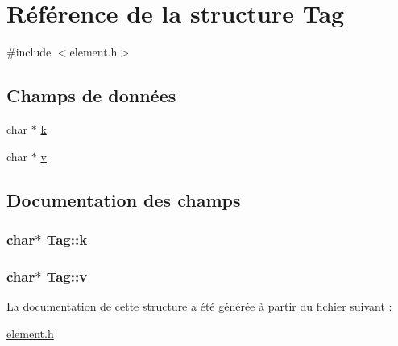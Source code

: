 \hypertarget{struct_tag}{\section{Référence de la structure Tag}
\label{struct_tag}
}


{\ttfamily \#include $<$element.\-h$>$}

\subsection*{Champs de données}
\begin{DoxyCompactItemize}
\item 
char $\ast$ \hyperlink{struct_tag_ab3bdc16ca229758a03a276652a061dff_ab3bdc16ca229758a03a276652a061dff}{k}
\item 
char $\ast$ \hyperlink{struct_tag_a647fb3252fe8d9a2f0eb7478685241fe_a647fb3252fe8d9a2f0eb7478685241fe}{v}
\end{DoxyCompactItemize}


\subsection{Documentation des champs}
\hypertarget{struct_tag_ab3bdc16ca229758a03a276652a061dff_ab3bdc16ca229758a03a276652a061dff}{
\subsubsection[{k}]{\setlength{\rightskip}{0pt plus 5cm}char$\ast$ Tag\-::k}}\label{struct_tag_ab3bdc16ca229758a03a276652a061dff_ab3bdc16ca229758a03a276652a061dff}
\hypertarget{struct_tag_a647fb3252fe8d9a2f0eb7478685241fe_a647fb3252fe8d9a2f0eb7478685241fe}{
\subsubsection[{v}]{\setlength{\rightskip}{0pt plus 5cm}char$\ast$ Tag\-::v}}\label{struct_tag_a647fb3252fe8d9a2f0eb7478685241fe_a647fb3252fe8d9a2f0eb7478685241fe}


La documentation de cette structure a été générée à partir du fichier suivant \-:\begin{DoxyCompactItemize}
\item 
\hyperlink{element_8h}{element.\-h}\end{DoxyCompactItemize}
